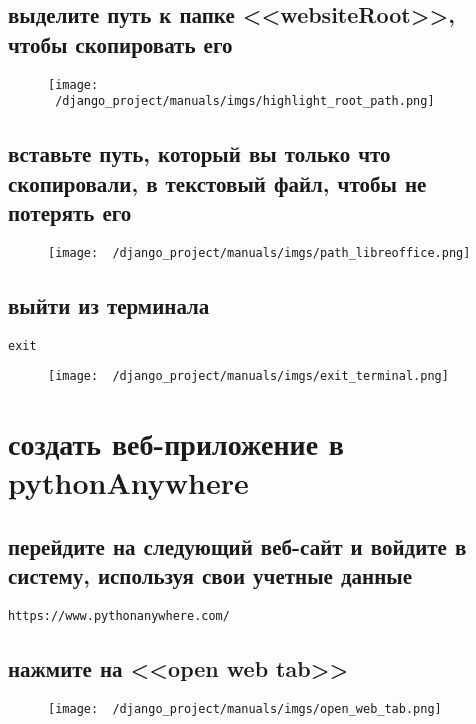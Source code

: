 \documentclass[12pt]{article}
\begin{document}
    \subsection{выделите путь к папке <<websiteRoot>>, чтобы скопировать его}
	\begin{figure}[H]
		\centering
		\texttt{[image: ~/django\_project/manuals/imgs/highlight\_root\_path.png]}
		\caption{}
	\end{figure}

  \subsection{вставьте путь, который вы только что скопировали, в текстовый файл, чтобы не потерять его}
	\begin{figure}[H]
		\centering
		\texttt{[image: ~/django\_project/manuals/imgs/path\_libreoffice.png]}
		\caption{}
	\end{figure}

    \subsection{ выйти из терминала}
			\begin{lstlisting}[caption=\phantom{},style=conlst,label={lst:enter_desktop}]
      exit
			\end{lstlisting}
	\begin{figure}[H]
		\centering
		\texttt{[image: ~/django\_project/manuals/imgs/exit\_terminal.png]}
		\caption{}
	\end{figure}
\section{создать веб-приложение в pythonAnywhere}


    \subsection{ перейдите на следующий веб-сайт и войдите в систему, используя свои учетные данные}
      \begin{lstlisting}[caption=\phantom{},style=conlst,label={lst:enter_desktop}]
      https://www.pythonanywhere.com/
			\end{lstlisting}

    \subsection{нажмите на <<open web tab>>}
	\begin{figure}[H]
		\centering
		\texttt{[image: ~/django\_project/manuals/imgs/open\_web\_tab.png]}
		\caption{}
	\end{figure}
\end{document}
